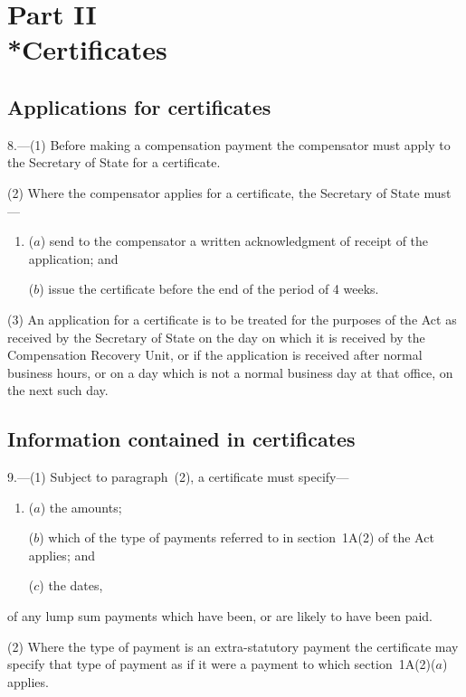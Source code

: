 \documentclass[12pt,a4paper]{article}
\begin{document}
\section[Part II --- Certificates]{Part II\\*Certificates}

\renewcommand\parthead{--- Part II}

\subsection[8. Applications for certificates]{Applications for certificates}

8.---(1)  Before making a compensation payment the compensator must apply to the Secretary of State for a certificate.

(2) Where the compensator applies for a certificate, the Secretary of State must—
\begin{enumerate}\item[]
($a$) send to the compensator a written acknowledgment of receipt of the application; and

($b$) issue the certificate before the end of the period of 4 weeks.
\end{enumerate}

(3) An application for a certificate is to be treated for the purposes of the Act as received by the Secretary of State on the day on which it is received by the Compensation Recovery Unit, or if the application is received after normal business hours, or on a day which is not a normal business day at that office, on the next such day.

\subsection[9. Information contained in certificates]{Information contained in certificates}

9.---(1)  Subject to paragraph~(2), a certificate must specify—
\begin{enumerate}\item[]
($a$) the amounts;

($b$) which of the type of payments referred to in section~1A(2) of the Act applies; and

($c$) the dates,
\end{enumerate}
of any lump sum payments which have been, or are likely to have been paid.

(2) Where the type of payment is an extra-statutory payment the certificate may specify that type of payment as if it were a payment to which section~1A(2)($a$)  applies.
\end{document}
